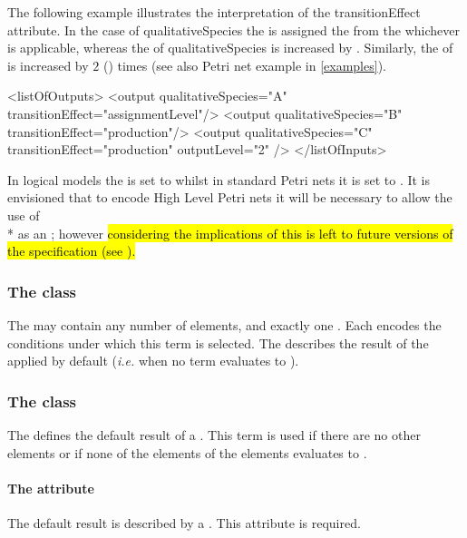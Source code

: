 The following example illustrates the interpretation of the transitionEffect attribute. In the case of qualitativeSpecies  the  is assigned the  from the whichever \FunctionTerm is applicable, whereas the  of qualitativeSpecies  is increased by . Similarly, the  of  is increased by $2$ () times  (see also Petri net example in \ref{examples}). 

\begin{example}
<listOfOutputs>
    <output qualitativeSpecies="A"   transitionEffect="assignmentLevel"/>
    <output qualitativeSpecies="B"   transitionEffect="production"/>
    <output qualitativeSpecies="C"   transitionEffect="production"  outputLevel="2" />
</listOfInputs>
\end{example}

In logical models the  is set to  whilst in standard Petri nets it is set to .  It is envisioned that to encode High Level Petri nets it will be necessary to allow the use of \\*  as an \Output {}; however \hl{considering the implications of this is left to future versions of the specification (see ).}

\subsubsection{The \ListOfFunctionTerms class}
\label{loft-class}

The \ListOfFunctionTerms may contain any number of \FunctionTerm elements, and exactly one \DefaultTerm.  Each \FunctionTerm encodes the conditions under which this term is selected.  The \DefaultTerm describes the result of the \Transition applied by default ({\em i.e.} when no term evaluates to ). 

\subsubsection{The \DefaultTerm class}
\label{defaultTerm-class}
The \DefaultTerm defines the default result of a \Transition.  This term is used if there are no other \FunctionTerm elements or if none of the  elements of the \FunctionTerm elements evaluates to . 

\paragraph{The  attribute}
The default result is described by a . This attribute is required.


